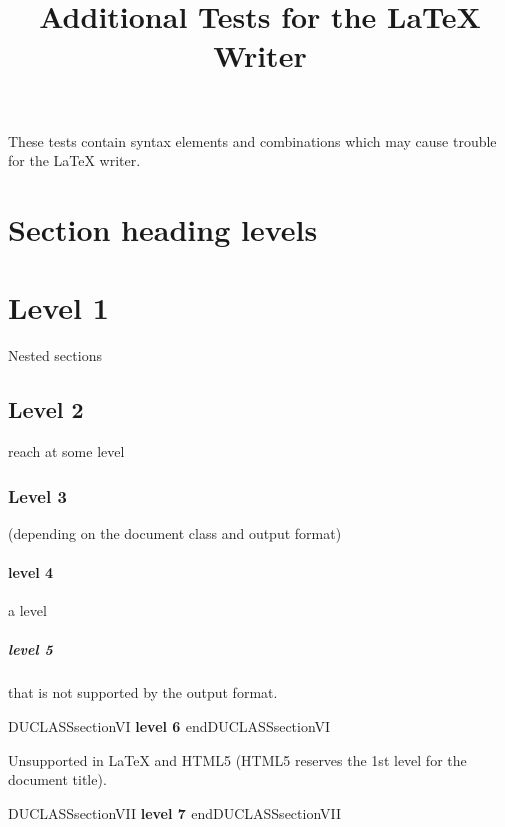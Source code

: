 \documentclass[a4paper]{article}
\newenvironment{DUclass}[1]%
  {%
   \def\DocutilsClassFunctionName{DUCLASS#1}
     \csname \DocutilsClassFunctionName \endcsname}%
  {\csname end\DocutilsClassFunctionName \endcsname}%
\providecommand*{\DUtitle}[1]{%
  \smallskip\noindent\textbf{#1}\smallskip}
\begin{document}
\title{Additional Tests for the LaTeX Writer%
  \label{additional-tests-for-the-latex-writer}}
\author{}
\date{}
\maketitle

These tests contain syntax elements and combinations which may cause
trouble for the LaTeX writer.

\label{contents}
\tableofcontents


\section{Section heading levels%
  \label{section-heading-levels}%
}


\section{Level 1%
  \label{level-1}%
}

Nested sections


\subsection{Level 2%
  \label{level-2}%
}

reach at some level


\subsubsection{Level 3%
  \label{level-3}%
}

(depending on the document class and output format)


\paragraph{level 4%
  \label{level-4}%
}

a level


\subparagraph{level 5%
  \label{level-5}%
}

that is not supported by the output format.


\begin{DUclass}{sectionVI}
\DUtitle{level 6%
  \label{level-6}%
}
\end{DUclass}

Unsupported in LaTeX and HTML5
(HTML5 reserves the 1st level for the document title).


\begin{DUclass}{sectionVII}
\DUtitle{level 7%
  \label{level-7}%
}
\end{DUclass}
\end{document}
